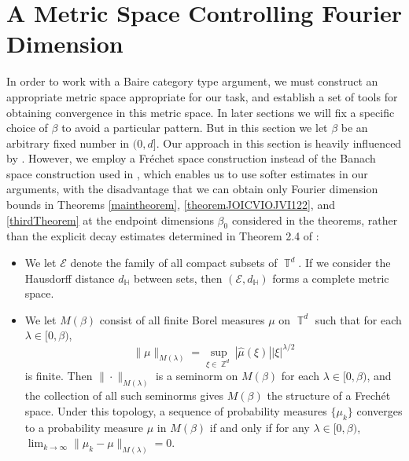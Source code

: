 \documentclass[dvipsnames,letterpaper,12pt]{article}
\numberwithin{equation}{section}
\DeclareMathOperator{\ZZ}{\mathbb{Z}}
\DeclareMathOperator{\TT}{\mathbb{T}}
\numberwithin{theorem}{section}
\begin{document}
\section{A Metric Space Controlling Fourier Dimension}

In order to work with a Baire category type argument, we must construct an appropriate metric space appropriate for our task, and establish a set of tools for obtaining convergence in this metric space. In later sections we will fix a specific choice of $\beta$ to avoid a particular pattern. But in this section we let $\beta$ be an arbitrary fixed number in $(0,d]$. Our approach in this section is heavily influenced by \cite{Korner2}. However, we employ a Fr\'{e}chet space construction instead of the Banach space construction used in \cite{Korner2}, which enables us to use softer estimates in our arguments, with the disadvantage that we can obtain only Fourier dimension bounds in Theorems \ref{maintheorem}, \ref{theoremJOICVIOJVI122}, and \ref{thirdTheorem} at the endpoint dimensions $\beta_0$ considered in the theorems, rather than the explicit decay estimates determined in Theorem 2.4 of \cite{Korner2}:
%
\begin{itemize}
    \item We let $\mathcal{E}$ denote the family of all compact subsets of $\TT^d$. If we consider the Hausdorff distance $d_{\mathbb{H}}$ between sets, then $(\mathcal{E},d_\mathbb{H})$ forms a complete metric space. %

    \item We let $M(\beta)$ consist of all finite Borel measures $\mu$ on $\TT^d$ such that for each $\lambda \in [0,\beta)$,
    \[ \| \mu \|_{M(\lambda)} = \sup_{\xi \in \ZZ^d} |\widehat{\mu}(\xi)| |\xi|^{\lambda/2} \]
    is finite. Then $\| \cdot \|_{M(\lambda)}$ is a seminorm on $M(\beta)$ for each $\lambda \in [0,\beta)$, and the collection of all such seminorms gives $M(\beta)$ the structure of a Frech\'{e}t space. Under this topology, a sequence of probability measures $\{ \mu_k \}$ converges to a probability measure $\mu$ in $M(\beta)$ if and only if for any $\lambda \in [0,\beta)$, $\lim_{k \to \infty} \| \mu_k - \mu \|_{M(\lambda)} = 0$.
\end{itemize}
\end{document}
